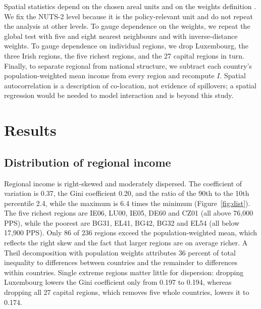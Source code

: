 \documentclass[11pt]{article}
\begin{document}
Spatial statistics depend on the chosen areal units and on the weights definition \citep{openshaw1984modifiable}. We fix the NUTS-2 level because it is the policy-relevant unit and do not repeat the analysis at other levels. To gauge dependence on the weights, we repeat the global test with five and eight nearest neighbours and with inverse-distance weights. To gauge dependence on individual regions, we drop Luxembourg, the three Irish regions, the five richest regions, and the 27 capital regions in turn. Finally, to separate regional from national structure, we subtract each country's population-weighted mean income from every region and recompute $I$. Spatial autocorrelation is a description of co-location, not evidence of spillovers; a spatial regression \citep{anselin1988spatial} would be needed to model interaction and is beyond this study.

\section{Results}

\subsection{Distribution of regional income}

Regional income is right-skewed and moderately dispersed. The coefficient of variation is 0.37, the Gini coefficient 0.20, and the ratio of the 90th to the 10th percentile 2.4, while the maximum is 6.4 times the minimum (Figure~\ref{fig:dist}).
The five richest regions are IE06, LU00, IE05, DE60 and CZ01 (all above 76,000 PPS), while the poorest are BG31, EL41, BG42, BG32 and EL54 (all below 17,900 PPS). Only 86 of 236 regions exceed the population-weighted mean, which reflects the right skew and the fact that larger regions are on average richer.
A Theil decomposition with population weights attributes 36 percent of total inequality to differences between countries and the remainder to differences within countries.
Single extreme regions matter little for dispersion: dropping Luxembourg lowers the Gini coefficient only from 0.197 to 0.194, whereas dropping all 27 capital regions, which removes five whole countries, lowers it to 0.174.
\end{document}
